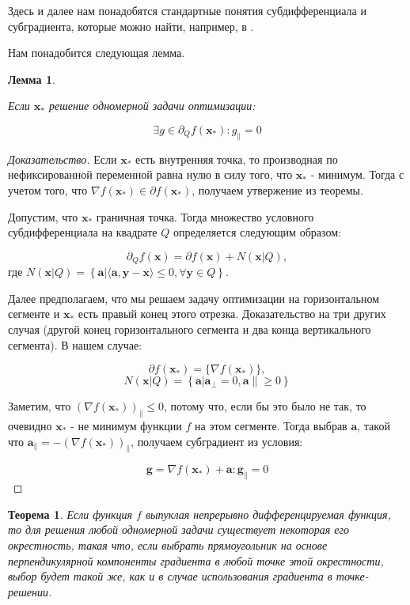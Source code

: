 \documentclass[12pt]{article}
\newtheorem{theorem}{Теорема}[section]
\newtheorem{lemma}{Лемма}[section]
\begin{document}
Здесь и далее нам понадобятся стандартные понятия субдифференциала и субградиента, которые можно найти, например, в \cite{Nesterov}.

Нам понадобится следующая лемма.

\begin{lemma}
\label{subgradient}

Если $\textbf{x}_*$ решение одномерной задачи оптимизации:

$$\exists g \in \partial_Q f(\textbf{x}_*) : g_\parallel = 0$$
\end{lemma}
\begin{proof}[Доказательство]
Если $\textbf{x}_*$ есть внутренняя точка, то производная по нефиксированной переменной равна нулю в силу того, что $\textbf{x}_*$ - минимум. Тогда с учетом того, что $\nabla f(\textbf{x}_*)\in\partial f(\textbf{x}_*)$, получаем утвержение из теоремы.

Допустим, что $\textbf{x}_*$ граничная точка. Тогда множество условного субдифференциала на квадрате $Q$ определяется следующим образом:

$$\partial_Q f(\textbf{x}) = \partial f(\textbf{x}) + N\left(\textbf{x}|Q\right),$$
где $N(\textbf{x}|Q) = \left\{\textbf{a}|\langle\textbf{a}, \textbf{y} - \textbf{x}\rangle\leq 0, \forall \textbf{y} \in Q\right\}$. 

Далее предполагаем, что мы решаем задачу оптимизации на горизонтальном сегменте и $\textbf{x}_*$ есть правый конец этого отрезка. Доказательство на три других случая (другой конец горизонтального сегмента и два конца вертикального сегмента). В нашем случае:

$$\partial f(\textbf{x}_*) = \{\nabla f(\textbf{x}_*)\},$$
$$N(\textbf{x}|Q) =\left\{\textbf{a}|\textbf{a}_\perp = 0, \textbf{a}\parallel \geq0\right\}$$

Заметим, что $\left(\nabla f(\textbf{x}_*)\right)_\parallel \leq 0$, потому что, если бы это было не так, то очевидно $\textbf{x}_*$ - не минимум функции $f$ на этом сегменте. Тогда выбрав $\textbf{a}$, такой что $\textbf{a}_\parallel = -\left(\nabla f(\textbf{x}_*)\right)_\parallel$, получаем субградиент из условия:

$$\textbf{g} = \nabla f(\textbf{x}_*) + \textbf{a} : \textbf{g}_\parallel =0$$
\end{proof}

\begin{theorem}
Если функция $f$ выпуклая непрерывно дифференцируемая функция, то для решения  любой одномерной задачи существует некоторая его окрестность, такая что, если выбрать прямоугольник на основе перпендикулярной компоненты градиента в любой точке этой окрестности, выбор будет такой же, как и в случае использования градиента в точке-решении.
\end{theorem}
\end{document}
